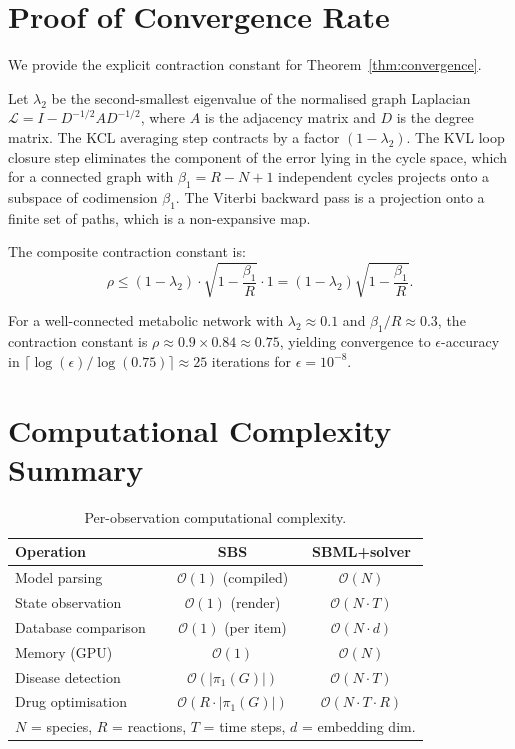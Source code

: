 \documentclass[11pt,twocolumn,a4paper]{article}
\newcommand{\BigO}{\mathcal{O}}
\begin{document}
\section{Proof of Convergence Rate}
\label{app:convergence-rate}

We provide the explicit contraction constant for
Theorem~\ref{thm:convergence}.

Let $\lambda_2$ be the second-smallest eigenvalue of the normalised
graph Laplacian $\mathcal{L} = I - D^{-1/2}AD^{-1/2}$, where $A$ is
the adjacency matrix and $D$ is the degree matrix.  The KCL averaging
step contracts by a factor $(1 - \lambda_2)$.  The KVL loop closure
step eliminates the component of the error lying in the cycle space,
which for a connected graph with $\beta_1 = R - N + 1$ independent
cycles projects onto a subspace of codimension $\beta_1$.  The Viterbi
backward pass is a projection onto a finite set of paths, which is
a non-expansive map.

The composite contraction constant is:
\begin{equation}
  \rho \leq (1 - \lambda_2) \cdot
  \sqrt{1 - \frac{\beta_1}{R}} \cdot 1
  = (1 - \lambda_2)\sqrt{1 - \frac{\beta_1}{R}}.
  \label{eq:contraction-constant}
\end{equation}

For a well-connected metabolic network with $\lambda_2 \approx 0.1$
and $\beta_1/R \approx 0.3$, the contraction constant is
$\rho \approx 0.9 \times 0.84 \approx 0.75$, yielding convergence to
$\epsilon$-accuracy in $\lceil \log(\epsilon) / \log(0.75) \rceil
\approx 25$ iterations for $\epsilon = 10^{-8}$.


\section{Computational Complexity Summary}
\label{app:complexity}

\begin{table}[H]
\centering
\caption{Per-observation computational complexity.}
\label{tab:complexity}
\small
\begin{tabular}{@{}lcc@{}}
\toprule
\textbf{Operation} & \textbf{SBS} & \textbf{SBML+solver} \\
\midrule
Model parsing          & $\BigO(1)$ (compiled) & $\BigO(N)$ \\
State observation      & $\BigO(1)$ (render)   & $\BigO(N \cdot T)$ \\
Database comparison    & $\BigO(1)$ (per item) & $\BigO(N \cdot d)$ \\
Memory (GPU)           & $\BigO(1)$            & $\BigO(N)$ \\
Disease detection      & $\BigO(|\pi_1(G)|)$   & $\BigO(N \cdot T)$ \\
Drug optimisation      & $\BigO(R \cdot |\pi_1(G)|)$ & $\BigO(N \cdot T \cdot R)$ \\
\bottomrule
\multicolumn{3}{l}{\footnotesize $N$ = species, $R$ = reactions,
$T$ = time steps, $d$ = embedding dim.}
\end{tabular}
\end{table}
\end{document}
